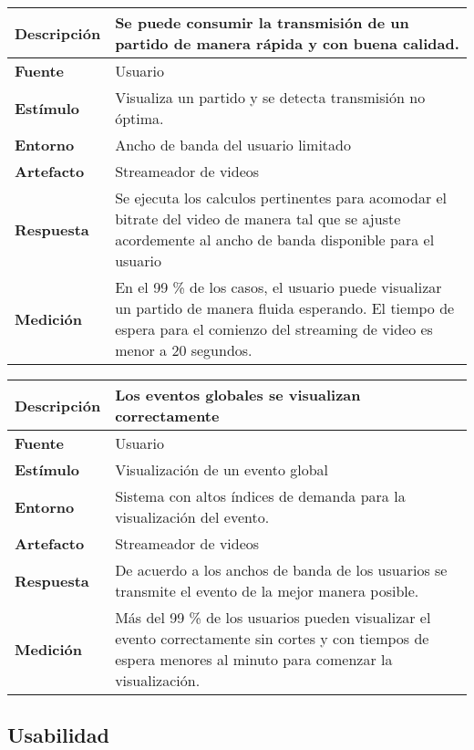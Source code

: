 \begin{center}
  \begin{tabular}{| l | p{10cm} | }
    \hline
	\textbf{Descripción} & Se puede consumir la transmisión de un partido de manera rápida y con buena calidad.\\  \hline
	\textbf{Fuente} & Usuario\\  \hline
	\textbf{Estímulo} & Visualiza un partido y se detecta transmisión no óptima.\\  \hline
	\textbf{Entorno} & Ancho de banda del usuario limitado\\  \hline
	\textbf{Artefacto} & Streameador de videos\\  \hline
	\textbf{Respuesta} & Se ejecuta los calculos pertinentes para acomodar el bitrate del video de manera tal que se ajuste acordemente al ancho de banda disponible para el usuario\\  \hline
	\textbf{Medición} & En el 99 \% de los casos, el usuario puede visualizar un partido de manera fluida esperando. El tiempo de espera para el comienzo del streaming de video es menor a 20 segundos.\\  \hline
  \end{tabular}
\end{center}

\begin{center}
  \begin{tabular}{| l | p{10cm} | }
    \hline
	\textbf{Descripción} & Los eventos globales se visualizan correctamente\\  \hline
	\textbf{Fuente} & Usuario\\  \hline
	\textbf{Estímulo} & Visualización de un evento global\\  \hline
	\textbf{Entorno} & Sistema con altos índices de demanda para la visualización del evento.\\  \hline
	\textbf{Artefacto} & Streameador de videos\\  \hline
	\textbf{Respuesta} & De acuerdo a los anchos de banda de los usuarios se transmite el evento de la mejor manera posible.\\  \hline
	\textbf{Medición} & Más del 99 \% de los usuarios pueden visualizar el evento correctamente sin cortes y con tiempos de espera menores al minuto para comenzar la visualización.\\  \hline
  \end{tabular}
\end{center}    


\subsection{Usabilidad}

